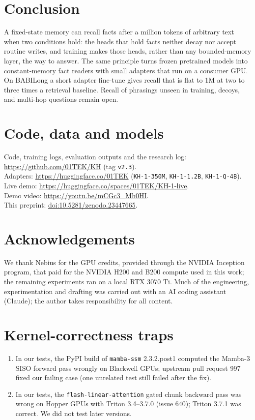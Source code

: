 \documentclass[11pt]{article}
\begin{document}
\section{Conclusion}
A fixed-state memory can recall facts after a million tokens of arbitrary text when two conditions hold: the heads that hold facts neither decay nor accept routine writes, and training makes those heads, rather than any bounded-memory layer, the way to answer. The same principle turns frozen pretrained models into constant-memory fact readers with small adapters that run on a consumer GPU. On BABILong a short adapter fine-tune gives recall that is flat to 1M at two to three times a retrieval baseline. Recall of phrasings unseen in training, decoys, and multi-hop questions remain open.

\section*{Code, data and models}
Code, training logs, evaluation outputs and the research log: \url{https://github.com/01TEK/KH} (tag \texttt{v2.3}).\\
Adapters: \url{https://huggingface.co/01TEK} (\texttt{KH-1-350M}, \texttt{KH-1-1.2B}, \texttt{KH-1-Q-4B}).\\
Live demo: \url{https://huggingface.co/spaces/01TEK/KH-1-live}.\\
Demo video: \url{https://youtu.be/mCGc3_Mh0HI}.\\
This preprint: \href{https://doi.org/10.5281/zenodo.23447665}{doi:10.5281/zenodo.23447665}.

\section*{Acknowledgements}
We thank Nebius for the GPU credits, provided through the NVIDIA Inception program, that paid for the NVIDIA H200 and B200 compute used in this work; the remaining experiments ran on a local RTX 3070 Ti. Much of the engineering, experimentation and drafting was carried out with an AI coding assistant (Claude); the author takes responsibility for all content.




\appendix

\section{Kernel-correctness traps}
\label{app:kernels}
\begin{enumerate}
\item In our tests, the PyPI build of \texttt{mamba-ssm} 2.3.2.post1 computed the Mamba-3 SISO forward pass wrongly on Blackwell GPUs; upstream pull request 997 fixed our failing case (one unrelated test still failed after the fix).
\item In our tests, the \texttt{flash-linear-attention} gated chunk backward pass was wrong on Hopper GPUs with Triton 3.4--3.7.0 (issue 640); Triton 3.7.1 was correct. We did not test later versions.
\end{enumerate}
\end{document}
